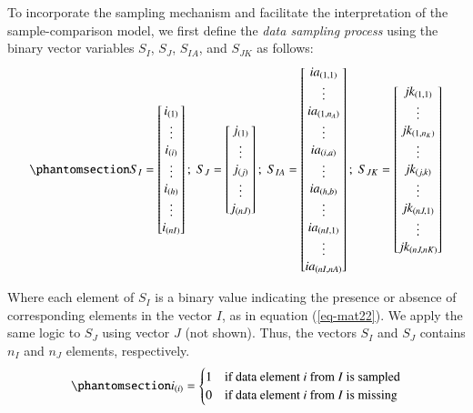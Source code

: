 \documentclass[
  authoryear,
  review,
  1p]{elsarticle}
\begin{document}
To incorporate the sampling mechanism and facilitate the interpretation
of the sample-comparison model, we first define the \emph{data sampling
process} using the binary vector variables \(S_{I}\), \(S_{J}\),
\(S_{IA}\), and \(S_{JK}\) as follows:
\begin{equation}\phantomsection\label{eq-mat21}{
S_{I} = \begin{bmatrix}
i_{(1)} \\
\vdots \\
i_{(i)} \\
\vdots \\
i_{(h)} \\
\vdots \\
i_{(nI)}
\end{bmatrix} ; \;
S_{J} = \begin{bmatrix}
j_{(1)} \\
\vdots \\
j_{(j)} \\
\vdots \\
j_{(nJ)}
\end{bmatrix} ; \;
S_{IA} = \begin{bmatrix}
ia_{(1,1)} \\
\vdots \\
ia_{(1,n_{A})} \\
\vdots \\
ia_{(i,a)} \\
\vdots \\
ia_{(h,b)} \\
\vdots \\
ia_{(nI,1)} \\
\vdots \\
ia_{(nI,nA)}
\end{bmatrix} ; \;
S_{JK} = \begin{bmatrix}
jk_{(1,1)} \\
\vdots \\
jk_{(1,n_{K})} \\
\vdots \\
jk_{(j,k)} \\
\vdots \\
jk_{(nJ,1)} \\
\vdots \\
jk_{(nJ,nK)}
\end{bmatrix}
}\end{equation}

Where each element of \(S_{I}\) is a binary value indicating the
presence or absence of corresponding elements in the vector \(I\), as in
equation (\ref{eq-mat22}). We apply the same logic to \(S_{J}\) using
vector \(J\) (not shown). Thus, the vectors \(S_{I}\) and \(S_{J}\)
contains \(n_{I}\) and \(n_{J}\) elements, respectively.
\begin{equation}\phantomsection\label{eq-mat22}{
i_{(i)} = \begin{cases} 
1 & \text{if data element } i \text{ from } I \text{ is sampled} \\
0 & \text{if data element } i \text{ from } I \text{ is missing}
\end{cases}
}\end{equation}
\end{document}
